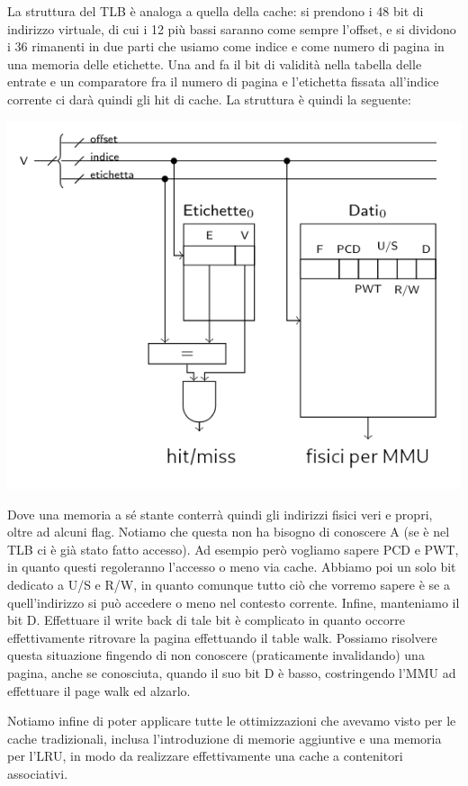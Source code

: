 \documentclass[a4paper,11pt]{article}
\begin{document}
La struttura del TLB è analoga a quella della cache: si prendono i 48 bit di indirizzo virtuale, di cui i 12 più bassi saranno come sempre l'offset, e si dividono i 36 rimanenti in due parti che usiamo come indice e come numero di pagina in una memoria delle etichette.
Una and fa il bit di validità nella tabella delle entrate e un comparatore fra il numero di pagina e l'etichetta fissata all'indice corrente ci darà quindi gli hit di cache.
La struttura è quindi la seguente:
\begin{center}
	\includegraphics[scale=0.8]{../figures/tlb.png}
\end{center}
Dove una memoria a sé stante conterrà quindi gli indirizzi fisici veri e propri, oltre ad alcuni flag.
Notiamo che questa non ha bisogno di conoscere A (se è nel TLB ci è già stato fatto accesso).
Ad esempio però vogliamo sapere PCD e PWT, in quanto questi regoleranno l'accesso o meno via cache.
Abbiamo poi un solo bit dedicato a U/S e R/W, in quanto comunque tutto ciò che vorremo sapere è se a quell'indirizzo si può accedere o meno nel contesto corrente.
Infine, manteniamo il bit D.
Effettuare il write back di tale bit è complicato in quanto occorre effettivamente ritrovare la pagina effettuando il table walk.
Possiamo risolvere questa situazione fingendo di non conoscere (praticamente invalidando) una pagina, anche se conosciuta, quando il suo bit D è basso, costringendo l'MMU ad effettuare il page walk ed alzarlo. 

Notiamo infine di poter applicare tutte le ottimizzazioni che avevamo visto per le cache tradizionali, inclusa l'introduzione di memorie aggiuntive e una memoria per l'LRU, in modo da realizzare effettivamente una cache a contenitori associativi.
\end{document}
